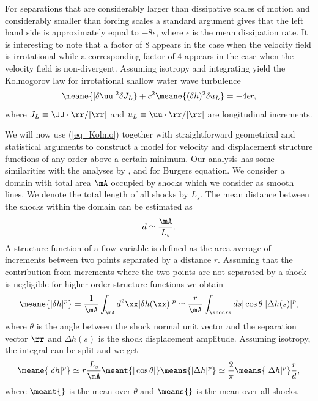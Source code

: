 For separations that are considerably larger than dissipative scales of motion and considerably smaller than forcing scales a standard argument \cite[see for example][]{Frisch} gives that the left hand side is approximately equal to $ -8 \epsilon $, where $ \epsilon $ is the mean dissipation rate. It is interesting to note that a factor of $ 8 $ appears in the case when the velocity field is irrotational while a corresponding factor of $ 4 $ appears in the case when the velocity field is non-divergent. 
Assuming isotropy and integrating yield the Kolmogorov law for
irrotational shallow water wave  turbulence
\begin{equation}
\meane{ |\delta \uu|^2 \delta J_L } 
+ c^2\meane{ (\delta h)^2 \delta u_L } = -4 \epsilon r, \label{eq_Kolmo}
\end{equation}
where $J_L \equiv
\JJ\cdot\rr / |\rr|$ and $u_L \equiv \uu\cdot\rr / |\rr|$ are
longitudinal increments.




We will now use (\ref{eq_Kolmo}) together with straightforward geometrical and statistical arguments to construct a model for velocity and displacement structure functions of any order above a certain minimum.
Our analysis has some similarities with the analyses by \cite{BouchaudMezardParisi1995}, \cite{WeinanKhaninMazelSinai1997} and \cite{Weinan}
for Burgers equation. 
We consider a domain with total area  $ {\mA} $ occupied by shocks which we 
consider as smooth lines. We denote the total length of all shocks by $ L_s $.  The mean distance between the shocks within the domain can be estimated as
\begin{equation}
d \simeq \frac{\mA} {L_s} .
\end{equation} 
A structure function of a flow variable is defined as the area average of increments  between two points separated by a distance $ r $.
Assuming that the contribution from increments where the two points are not separated by a shock is negligible for higher order structure functions we obtain
\begin{eqnarray}
\meane{|\delta h|^p} 
=  \frac{1}{\mA} \int_{\mA}  d^2\xx |\delta h(\xx)|^p 
 \simeq  \frac{r}{\mA} \int_\shocks ds |\cos\theta| |\Delta h (s)|^p,
\end{eqnarray}
where $\theta$ is the angle between the shock normal unit vector and the separation
vector $\rr$ %
and $\Delta h (s)$ is the shock displacement amplitude.
%
Assuming isotropy, the integral can be split and we get
\begin{equation} \label{StepH}
\meane{|\delta h|^p} 
\simeq 
r \frac{L_s}{\mA} \meant{|\cos\theta|} \means{|\Delta h |^p}
\simeq  \frac{2}{\pi} \means{|\Delta h |^p} \frac{r}{d} ,
\end{equation}
where $\meant{}$ is the mean over $\theta$
and $\means{}$ is the mean over all shocks.

